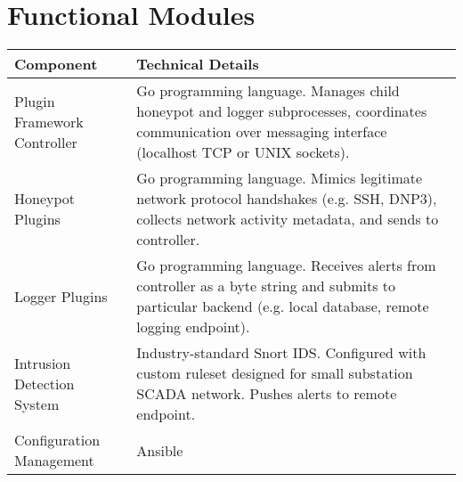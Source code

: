 \section*{\color{NavyBlue}Functional Modules}

\large

\begin{center}
\begin{tabularx}{\linewidth}{X | X}
\toprule
\textbf{Component} & \textbf{Technical Details} \\
\midrule
Plugin Framework Controller & Go programming language. Manages child honeypot and logger subprocesses, coordinates communication over messaging interface (localhost TCP or UNIX sockets).\\ \hline
Honeypot Plugins & Go programming language. Mimics legitimate network protocol handshakes (e.g. SSH, DNP3), collects network activity metadata, and sends to controller. \\ \hline
Logger Plugins & Go programming language. Receives alerts from controller as a byte string and submits to particular backend (e.g. local database, remote logging endpoint).\\ \hline
Intrusion Detection System & Industry-standard Snort IDS. Configured with custom ruleset designed for small substation SCADA network. Pushes alerts to remote
endpoint. \\ \hline
Configuration Management & Ansible\\
\bottomrule
\end{tabularx}
\end{center}
